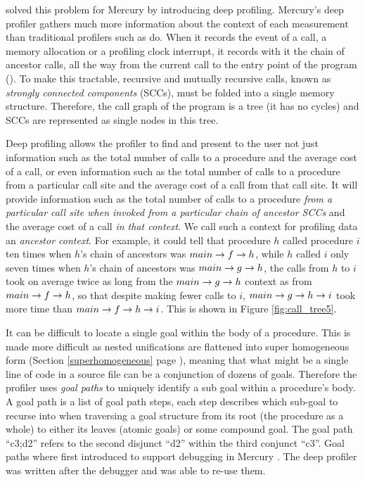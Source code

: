 \citep{conway:2001:mercury-deep}
solved this problem for Mercury by introducing deep profiling.
Mercury's deep profiler gathers much more information about the context of
each measurement than traditional profilers such as  \citep{gprof} do.
When it records the event of a call,
a memory allocation or a profiling clock interrupt,
it records with it the chain of ancestor calls,
all the way from the current call to the entry point of the program
().
To make this tractable,
recursive and mutually recursive calls,
known as \emph{strongly connected components} (SCCs),
must be folded into a single memory structure.
Therefore, the call graph of the program is a tree (it has no cycles)
and SCCs are represented as single nodes in this tree.

Deep profiling allows the profiler to find and present to the user
not just information such as the total number of calls to a procedure
and the average cost of a call,
or even information such as the total number of calls to a procedure
from a particular call site and the average cost of a call from that call
site.
It will provide information such as the total number of calls to a procedure
\emph{from a particular call site
when invoked from a particular chain of ancestor SCCs}
and the average cost of a call \emph{in that context}.
We call such a context for profiling data an \emph{ancestor context}.
For example, it could tell that
procedure $h$ called procedure $i$ ten times
when $h$'s chain of ancestors was $main \rightarrow f \rightarrow h$,
while $h$ called $i$ only seven times
when $h$'s chain of ancestors was $main \rightarrow g \rightarrow h$,
the calls from $h$ to $i$ took on average twice as long
from the $main \rightarrow g \rightarrow h$ context as from $main \rightarrow f \rightarrow h$,
so that despite making fewer calls to $i$,
$main \rightarrow g \rightarrow h \rightarrow i$ took more time than $main \rightarrow f \rightarrow h \rightarrow i$.
This is shown in Figure \ref{fig:call_tree5}.


It can be difficult to locate a single goal within the body of a procedure.
This is made more difficult as nested unifications are flattened into super
homogeneous form
(Section \ref{superhomogeneous} page \pageref{superhomogeneous}),
meaning that what might be a single line of code in a source file
can be a conjunction of dozens of goals.
Therefore the profiler uses \emph{goal paths} to uniquely identify a sub
goal within a procedure's body.
A goal path is a list of goal path steps, each step describes which
sub-goal to recurse into when traversing a goal structure from its
root (the procedure as a whole)
to either its leaves (atomic goals) or some compound goal.
The goal path ``c3;d2'' refers to the second disjunct ``d2'' within the
third conjunct ``c3''.
Goal paths where first introduced to support debugging in Mercury \citep{mdb}.
The deep profiler was written after the debugger and was able to re-use them.

